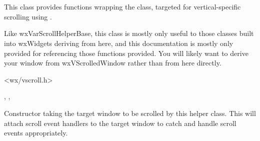 
\section{}\label{wxvarvscrollhelper}

This class provides functions wrapping the 
 class, targeted for
vertical-specific scrolling using .

Like wxVarScrollHelperBase, this class is mostly only useful to those classes
built into wxWidgets deriving from here, and this documentation is mostly
only provided for referencing those functions provided. You will likely want
to derive your window from wxVScrolledWindow rather than from here directly.




<wx/vscroll.h>


,
\rtfsp{},
\rtfsp{}



\label{wxvarvscrollhelperwxvarvscrollhelper}


Constructor taking the target window to be scrolled by this helper class.
This will attach scroll event handlers to the target window to catch and
handle scroll events appropriately.


\label{wxvarvscrollhelperestimatetotalheight}


